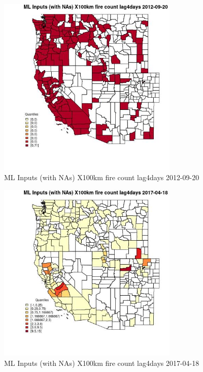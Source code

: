 \begin{figure} 
\centering  
\includegraphics[width=0.77\textwidth]{Code_Outputs/Report_ML_input_PM25_Step4_part_e_de_duplicated_aves_compiled_2019-05-14wNAs_CountyX100km_fire_count_lag4daysMean2012-09-20_2012-09-20.jpg} 
\caption{\label{fig:Report_ML_input_PM25_Step4_part_e_de_duplicated_aves_compiled_2019-05-14wNAsCountyX100km_fire_count_lag4daysMean2012-09-20_2012-09-20}ML Inputs (with NAs) X100km fire count lag4days 2012-09-20} 
\end{figure} 
 

\begin{figure} 
\centering  
\includegraphics[width=0.77\textwidth]{Code_Outputs/Report_ML_input_PM25_Step4_part_e_de_duplicated_aves_compiled_2019-05-14wNAs_CountyX100km_fire_count_lag4daysMean2017-04-18_2017-04-18.jpg} 
\caption{\label{fig:Report_ML_input_PM25_Step4_part_e_de_duplicated_aves_compiled_2019-05-14wNAsCountyX100km_fire_count_lag4daysMean2017-04-18_2017-04-18}ML Inputs (with NAs) X100km fire count lag4days 2017-04-18} 
\end{figure} 
 

